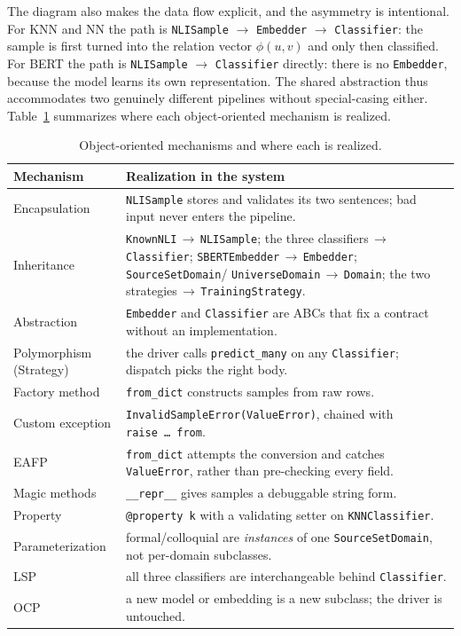 \documentclass[conference]{IEEEtran}
\begin{document}
The diagram also makes the data flow explicit, and the asymmetry is
intentional. For KNN and NN the path is
\texttt{NLISample} $\rightarrow$ \texttt{Embedder} $\rightarrow$
\texttt{Classifier}: the sample is first turned into the relation vector
$\phi(u,v)$ and only then classified. For BERT the path is
\texttt{NLISample} $\rightarrow$ \texttt{Classifier} directly: there is
no \texttt{Embedder}, because the model learns its own representation.
The shared abstraction thus accommodates two genuinely different
pipelines without special-casing either. Table~\ref{tab:oop} summarizes
where each object-oriented mechanism is realized.

\begin{table}[t]
\centering
\footnotesize
\caption{Object-oriented mechanisms and where each is realized.}
\label{tab:oop}
\newcommand{\arr}{\,\allowbreak$\rightarrow$\,\allowbreak}
\begin{tabular}{@{}>{\raggedright\arraybackslash}p{1.95cm}>{\raggedright\arraybackslash}p{5.75cm}@{}}
\toprule
Mechanism & Realization in the system \\
\midrule
Encapsulation & \texttt{NLISample} stores and validates its two sentences; bad input never enters the pipeline. \\
Inheritance & \texttt{KnownNLI}\arr\texttt{NLISample}; the three classifiers\arr\texttt{Classifier}; \texttt{SBERTEmbedder}\arr\texttt{Embedder}; \texttt{SourceSetDomain}/ \texttt{UniverseDomain}\arr\texttt{Domain}; the two strategies\arr\texttt{TrainingStrategy}. \\
Abstraction & \texttt{Embedder} and \texttt{Classifier} are ABCs that fix a contract without an implementation. \\
Polymorphism (Strategy) & the driver calls \texttt{predict\_many} on any \texttt{Classifier}; dispatch picks the right body. \\
Factory method & \texttt{from\_dict} constructs samples from raw rows. \\
Custom exception & \texttt{InvalidSampleError(ValueError)}, chained with \texttt{raise\,\ldots\,from}. \\
EAFP & \texttt{from\_dict} attempts the conversion and catches \texttt{ValueError}, rather than pre-checking every field. \\
Magic methods & \texttt{\_\_repr\_\_} gives samples a debuggable string form. \\
Property & \texttt{@property k} with a validating setter on \texttt{KNNClassifier}. \\
Parameterization & formal/colloquial are \emph{instances} of one \texttt{SourceSetDomain}, not per-domain subclasses. \\
LSP & all three classifiers are interchangeable behind \texttt{Classifier}. \\
OCP & a new model or embedding is a new subclass; the driver is untouched. \\
\bottomrule
\end{tabular}
\end{table}
\end{document}
